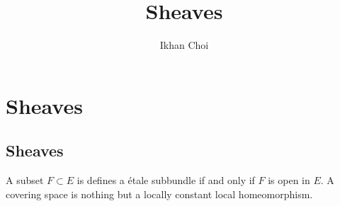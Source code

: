 \documentclass{../../large}
\begin{document}
\title{Sheaves}
\author{Ikhan Choi}
\maketitle
\tableofcontents




\part{Sheaves}

\chapter{Sheaves}



A subset $F\subset E$ is defines a \'etale subbundle if and only if $F$ is open in $E$.
A covering space is nothing but a locally constant local homeomorphism.
\end{document}
